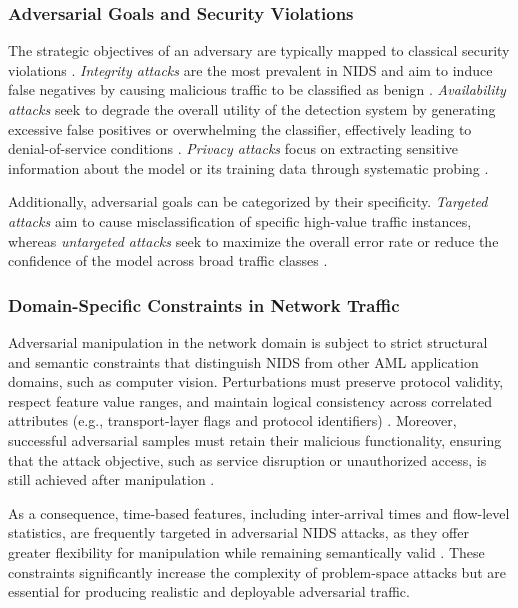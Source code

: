 \subsubsection{Adversarial Goals and Security Violations}

The strategic objectives of an adversary are typically mapped to classical security violations \cite{zhang2015adversarial}. 
\textit{Integrity attacks} are the most prevalent in NIDS and aim to induce false negatives by causing malicious traffic to be classified as benign \cite{huang2011adversarial}. 
\textit{Availability attacks} seek to degrade the overall utility of the detection system by generating excessive false positives or overwhelming the classifier, effectively leading to denial-of-service conditions \cite{corona2013adversarial}. 
\textit{Privacy attacks} focus on extracting sensitive information about the model or its training data through systematic probing \cite{miller2020adversarial}.

Additionally, adversarial goals can be categorized by their specificity. 
\textit{Targeted attacks} aim to cause misclassification of specific high-value traffic instances, whereas \textit{untargeted attacks} seek to maximize the overall error rate or reduce the confidence of the model across broad traffic classes \cite{alasad2026comprehensive}.

\subsubsection{Domain-Specific Constraints in Network Traffic}

Adversarial manipulation in the network domain is subject to strict structural and semantic constraints that distinguish NIDS from other AML application domains, such as computer vision. Perturbations must preserve protocol validity, respect feature value ranges, and maintain logical consistency across correlated attributes (e.g., transport-layer flags and protocol identifiers) \cite{hartl2020explainability, merzouk2022investigating}. Moreover, successful adversarial samples must retain their malicious functionality, ensuring that the attack objective, such as service disruption or unauthorized access, is still achieved after manipulation \cite{li2020adversarial}. 

As a consequence, time-based features, including inter-arrival times and flow-level statistics, are frequently targeted in adversarial NIDS attacks, as they offer greater flexibility for manipulation while remaining semantically valid \cite{zhang2022adversarial}. These constraints significantly increase the complexity of problem-space attacks but are essential for producing realistic and deployable adversarial traffic.

